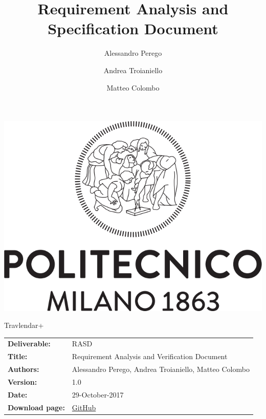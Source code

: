 



\title{\textbf{Requirement Analysis and Specification Document}}
\author{Alessandro Perego \and Andrea Troianiello \and Matteo Colombo}

\begin{titlepage}
\maketitle
\thispagestyle{empty}
\centering
\includegraphics[scale=0.3]{Images/polimi}\\
\vspace*{5cm}

{\fontsize{2cm}{2.5cm}\selectfont Travlendar+}\\
\end{titlepage}

\begin{table}[h!]
\begin{tabu} to \textwidth { X[0.3,r,p] X[0.7,l,p] }
\hline

\textbf{Deliverable:} & RASD\\
\textbf{Title:} & Requirement Analysis and Verification Document \\
\textbf{Authors:} & Alessandro Perego, Andrea Troianiello, Matteo Colombo \\
\textbf{Version:} & 1.0 \\ 
\textbf{Date:} & 29-October-2017 \\
\textbf{Download page:} & \href{https://github.com/MatteoColombo/ColomboPeregoTroianiello}{GitHub} \\
\hline
\end{tabu}
\end{table}




